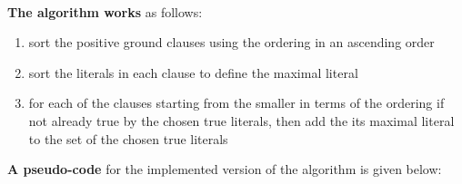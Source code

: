 		\paragraph{}
		\textbf{The algorithm works} as follows:
			
			\begin{enumerate}
				\item sort the positive ground clauses using the ordering in an ascending order
				\item sort the literals in each clause to define the maximal literal
				\item for each of the clauses starting from the smaller in terms of the ordering if not already true by the chosen true literals, then add the its maximal literal to the set of the chosen true literals 
			\end{enumerate}
		
		\textbf{A pseudo-code} for the implemented version of the algorithm is given below:


